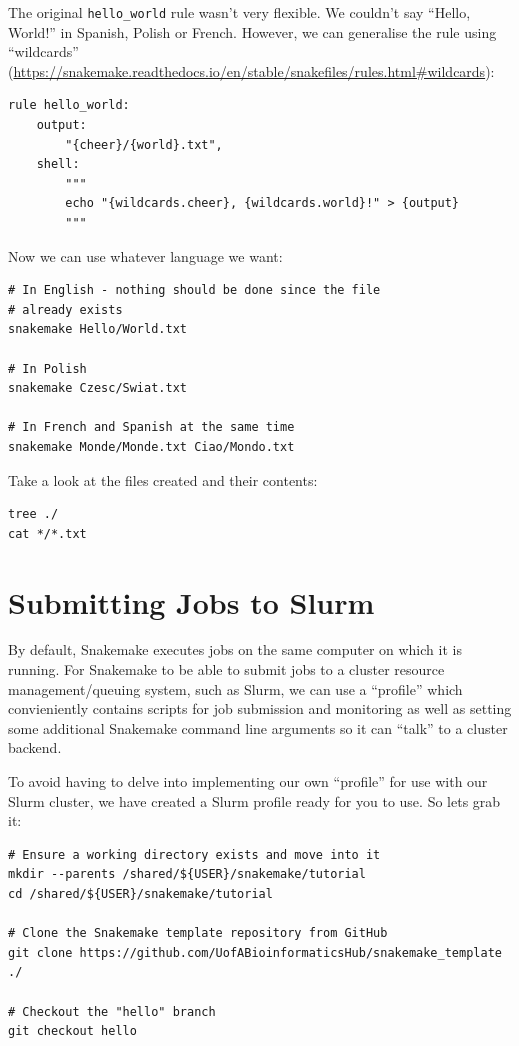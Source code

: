 The original \texttt{hello\_world} rule wasn't very flexible. We couldn't say ``Hello, World!'' in Spanish, Polish
or French. However, we can generalise the rule using ``wildcards'' (\url{https://snakemake.readthedocs.io/en/stable/snakefiles/rules.html#wildcards}):

\begin{lstlisting}
rule hello_world:
	output:
		"{cheer}/{world}.txt",
	shell:
		"""
		echo "{wildcards.cheer}, {wildcards.world}!" > {output}
		"""
\end{lstlisting}

Now we can use whatever language we want:

\begin{lstlisting}
# In English - nothing should be done since the file
# already exists
snakemake Hello/World.txt

# In Polish
snakemake Czesc/Swiat.txt

# In French and Spanish at the same time
snakemake Monde/Monde.txt Ciao/Mondo.txt
\end{lstlisting}

Take a look at the files created and their contents:

\begin{lstlisting}
tree ./
cat */*.txt
\end{lstlisting}

\section{Submitting Jobs to Slurm}

By default, Snakemake executes jobs on the same computer on which it is running. For Snakemake to be able to
submit jobs to a cluster resource management/queuing system, such as Slurm, we can use a ``profile'' which
convieniently contains scripts for job submission and monitoring as well as setting some additional Snakemake
command line arguments so it can ``talk'' to a cluster backend.

To avoid having to delve into implementing our own ``profile'' for use with our Slurm cluster, we have created
a Slurm profile ready for you to use. So lets grab it:

\begin{lstlisting}
# Ensure a working directory exists and move into it
mkdir --parents /shared/${USER}/snakemake/tutorial
cd /shared/${USER}/snakemake/tutorial

# Clone the Snakemake template repository from GitHub
git clone https://github.com/UofABioinformaticsHub/snakemake_template ./

# Checkout the "hello" branch
git checkout hello
\end{lstlisting}

